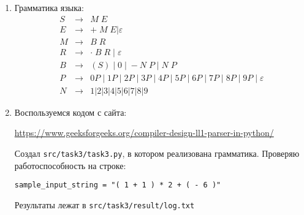 \documentclass{article}
\begin{document}
\begin{enumerate}
	\item Грамматика языка:
	\[\begin{array}{lll}
	S & \to & M \;E \\
	E & \to & + \;M\; E| \varepsilon\\
	M & \to & B\; R \\
	R & \to &  \cdot \; B\; R \;|\; \varepsilon \\
	B & \to & (S) \;|\; 0 \;|\; -\! N\; P \;|\; N\; P  \\
	P & \to & 0 P\; |\; 1P \;|\; 2P \;|\; 3P \;|\; 4 P \;|\; 5 P \;|\; 6 P \;|\; 7P \;|\; 8P \;|\; 9P \;|\;\varepsilon \\
	N & \to & 1| 2 | 3 | 4 | 5 | 6 | 7 | 8 | 9
	\end{array}\]
	
	\item Воспользуемся кодом с сайта:
	
	\url{https://www.geeksforgeeks.org/compiler-design-ll1-parser-in-python/}
	
	Создал \texttt{src/task3/task3.py}, в котором реализована грамматика. Проверяю работоспособность на строке:
	
	\texttt{sample\_input\_string = "( 1 + 1 ) * 2 + ( - 6 )"}
	
	Результаты лежат в \texttt{src/task3/result/log.txt}
	
\end{enumerate}



	
\end{document}
